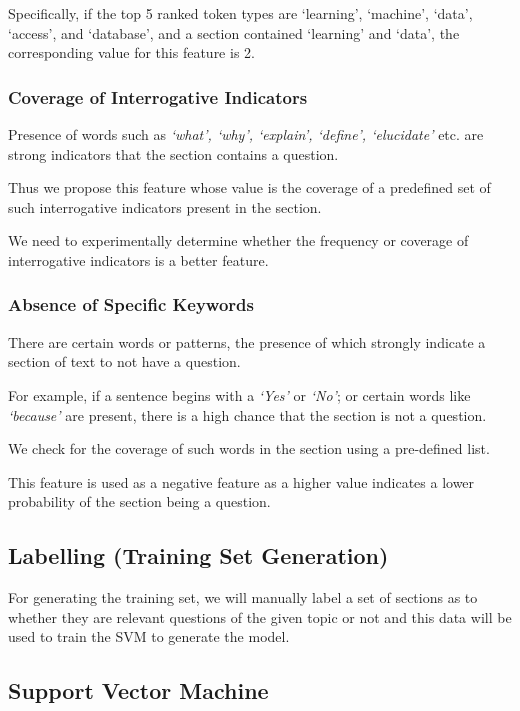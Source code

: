 \documentclass[10pt,a4paper]{report}
\begin{document}
Specifically, if the top 5 ranked token types are `learning', `machine', `data', `access', and `database', and a section contained `learning' and `data', the corresponding value for this feature is 2.

\subsubsection {Coverage of Interrogative Indicators}

Presence of words such as \textit{`what', `why', `explain', `define', `elucidate'} etc. are strong indicators that the section contains a question. 

Thus we propose this feature whose value is the coverage of a predefined set of such interrogative indicators present in the section.

We need to experimentally determine whether the frequency or coverage of interrogative indicators is a better feature.

\subsubsection {Absence of Specific Keywords}

There are certain words or patterns, the presence of which strongly indicate a section of text to not have a question. 

For example, if a sentence begins with a \textit{`Yes'} or \textit{`No'}; or certain words like \textit{`because'} are present, there is a high chance that the section is not a question. 

We check for the coverage of such words in the section using a pre-defined list. 

This feature is used as a negative feature as a higher value indicates a lower probability of the section being a question.

\subsection{Labelling (Training Set Generation)}

For generating the training set, we will manually label a set of sections as to whether they are relevant questions of the given topic or not and this data will be used to train the SVM to generate the model. 

\subsection{Support Vector Machine}
\end{document}
